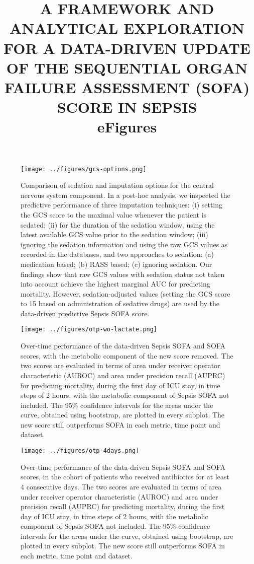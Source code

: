 \documentclass[
]{article}
\title{A FRAMEWORK AND ANALYTICAL EXPLORATION FOR A DATA-DRIVEN UPDATE OF THE SEQUENTIAL ORGAN FAILURE ASSESSMENT (SOFA) SCORE IN SEPSIS \\ eFigures}
\author{}
\date{\vspace{-2.5em}}
\begin{document}
\maketitle

\begin{figure}
    \centering
    \texttt{[image: ../figures/gcs-options.png]}
    \caption{Comparison of sedation and imputation options for the central
    nervous system component. In a post-hoc analysis, we inspected the predictive
    performance of three imputation techniques: (i) setting the GCS score to the
    maximal value whenever the patient is sedated; (ii) for the duration of the
    sedation window, using the latest available GCS value prior to the sedation
    window; (iii) ignoring the sedation information and using the raw GCS values
    as recorded in the databases, and two approaches to sedation: (a) medication
    based; (b) RASS based; (c) ignoring sedation. Our findings show that raw GCS
    values with sedation status not taken into account achieve the highest
    marginal AUC for predicting mortality. However, sedation-adjusted values
    (setting the GCS score to 15 based on administration of sedative drugs) are
    used by the data-driven predictive Sepsis SOFA score.}
\end{figure}


\begin{figure}
    \centering
    \texttt{[image: ../figures/otp-wo-lactate.png]}
    \caption{Over-time performance of the data-driven Sepsis SOFA and SOFA scores,
    with the metabolic component of the new score removed. The two scores are
    evaluated in terms of area under receiver operator characteristic (AUROC)
    and area under precision recall (AUPRC) for predicting mortality, during the
    first day of ICU stay, in time steps of 2 hours, with the metabolic component
    of Sepsis SOFA not included. The 95\% confidence intervals for the areas
    under the curve, obtained using bootstrap, are plotted in every subplot. The
    new score still outperforms SOFA in each metric, time point and dataset.}
\end{figure}

\begin{figure}
    \centering
    \texttt{[image: ../figures/otp-4days.png]}
    \caption{Over-time performance of the data-driven Sepsis SOFA and SOFA scores,
    in the cohort of patients who received antibiotics for at least 4 consecutive days.
    The two scores are evaluated in terms of area under receiver operator
    characteristic (AUROC) and area under precision recall (AUPRC) for predicting
    mortality, during the first day of ICU stay, in time steps of 2 hours, with
    the metabolic component of Sepsis SOFA not included. The
    95\% confidence intervals for the areas under the curve, obtained using
    bootstrap, are plotted in every subplot. The new score still outperforms
    SOFA in each metric, time point and dataset.}
\end{figure}
\end{document}
